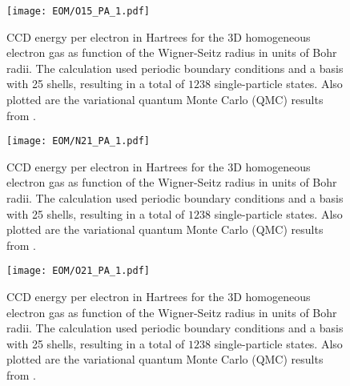 \documentclass[thesis.tex]{subfiles}
\begin{document}
\begin{figure}[h]
  \texttt{[image: EOM/O15\_PA\_1.pdf]}
  \caption{CCD energy per electron in Hartrees for the 3D homogeneous electron gas as function of the Wigner-Seitz radius in units of Bohr radii. The calculation used periodic boundary conditions and a basis with 25 shells, resulting in a total of $1238$ single-particle states. Also plotted are the variational quantum Monte Carlo (QMC) results from \cite{LOPEZ2006}.}
  \label{fig:QDground}
\end{figure}

\begin{figure}[h]
  \texttt{[image: EOM/N21\_PA\_1.pdf]}
  \caption{CCD energy per electron in Hartrees for the 3D homogeneous electron gas as function of the Wigner-Seitz radius in units of Bohr radii. The calculation used periodic boundary conditions and a basis with 25 shells, resulting in a total of $1238$ single-particle states. Also plotted are the variational quantum Monte Carlo (QMC) results from \cite{LOPEZ2006}.}
  \label{fig:QDground}
\end{figure}

\begin{figure}[h]
  \texttt{[image: EOM/O21\_PA\_1.pdf]}
  \caption{CCD energy per electron in Hartrees for the 3D homogeneous electron gas as function of the Wigner-Seitz radius in units of Bohr radii. The calculation used periodic boundary conditions and a basis with 25 shells, resulting in a total of $1238$ single-particle states. Also plotted are the variational quantum Monte Carlo (QMC) results from \cite{LOPEZ2006}.}
  \label{fig:QDground}
\end{figure}
\end{document}
